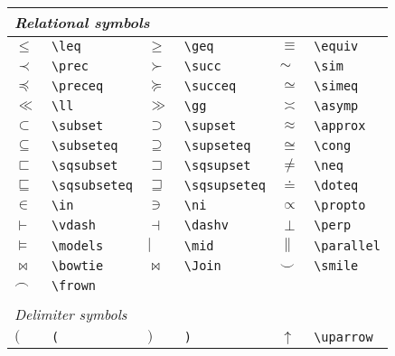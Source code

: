\begin{tabular}{llllll}
\\
\multicolumn{6}{l}{\em Relational symbols} \\ \hline
$\leq$               & \verb+\leq+               & $\geq$                  & \verb+\geq+                & $\equiv$       & \verb+\equiv+ \\
$\prec$              & \verb+\prec+              & $\succ$                 & \verb+\succ+               & $\sim$         & \verb+\sim+ \\
$\preceq$            & \verb+\preceq+            & $\succeq$               & \verb+\succeq+             & $\simeq$       & \verb+\simeq+ \\
$\ll$                & \verb+\ll+                & $\gg$                   & \verb+\gg+                 & $\asymp$       & \verb+\asymp+ \\
$\subset$            & \verb+\subset+            & $\supset$               & \verb+\supset+             & $\approx$      & \verb+\approx+ \\
$\subseteq$          & \verb+\subseteq+          & $\supseteq$             & \verb+\supseteq+           & $\cong$        & \verb+\cong+ \\
$\sqsubset$          & \verb+\sqsubset+          & $\sqsupset$             & \verb+\sqsupset+           & $\neq$         & \verb+\neq+ \\
$\sqsubseteq$        & \verb+\sqsubseteq+        & $\sqsupseteq$           & \verb+\sqsupseteq+         & $\doteq$       & \verb+\doteq+ \\
$\in$                & \verb+\in+                & $\ni$                   & \verb+\ni+                 & $\propto$      & \verb+\propto+ \\
$\vdash$             & \verb+\vdash+             & $\dashv$                & \verb+\dashv+              & $\perp$        & \verb+\perp+ \\
$\models$            & \verb+\models+            & $\mid$                  & \verb+\mid+                & $\parallel$    & \verb+\parallel+ \\
$\bowtie$            & \verb+\bowtie+            & $\Join$                 & \verb+\Join+               & $\smile$       & \verb+\smile+ \\
$\frown$             & \verb+\frown+ \\
\\
\multicolumn{6}{l}{\em Delimiter symbols} \\ \hline
$($                  & \verb+(+                  & $)$                     & \verb+)+                   & $\uparrow$     & \verb+\uparrow+ \\

\end{tabular}
